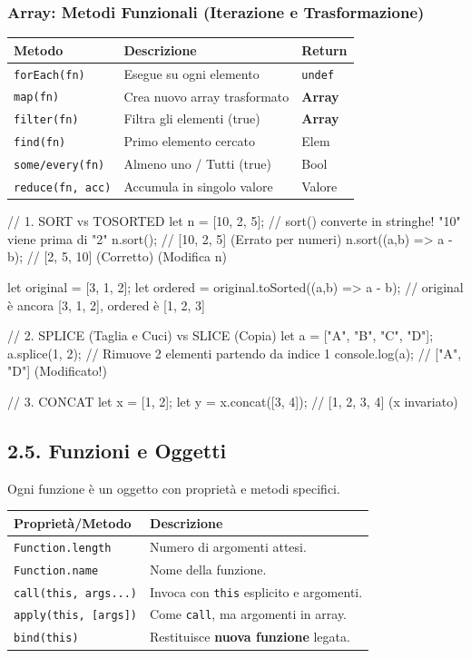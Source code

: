 \subsubsection{Array: Metodi Funzionali (Iterazione e Trasformazione)}
\begin{center}
\begin{tabular}{|l|p{5cm}|l|}
\hline
\textbf{Metodo} & \textbf{Descrizione} & \textbf{Return} \\
\hline
\texttt{forEach(fn)} & Esegue su ogni elemento & \texttt{undef} \\
\hline
\texttt{map(fn)} & Crea nuovo array trasformato & \textbf{Array} \\
\hline
\texttt{filter(fn)} & Filtra gli elementi (true) & \textbf{Array} \\
\hline
\texttt{find(fn)} & Primo elemento cercato & Elem \\
\hline
\texttt{some/every(fn)} & Almeno uno / Tutti (true) & Bool \\
\hline
\texttt{reduce(fn, acc)} & Accumula in singolo valore & Valore \\
\hline
\end{tabular}
\end{center}

\begin{jsbox}
// 1. SORT vs TOSORTED
let n = [10, 2, 5];
// sort() converte in stringhe! "10" viene prima di "2"
n.sort(); // [10, 2, 5] (Errato per numeri)
n.sort((a,b) => a - b); // [2, 5, 10] (Corretto) (Modifica n)

let original = [3, 1, 2];
let ordered = original.toSorted((a,b) => a - b); 
// original è ancora [3, 1, 2], ordered è [1, 2, 3]

// 2. SPLICE (Taglia e Cuci) vs SLICE (Copia)
let a = ["A", "B", "C", "D"];
a.splice(1, 2); // Rimuove 2 elementi partendo da indice 1
console.log(a); // ["A", "D"] (Modificato!)

// 3. CONCAT
let x = [1, 2];
let y = x.concat([3, 4]); // [1, 2, 3, 4] (x invariato)
\end{jsbox}

\subsection{2.5. Funzioni e Oggetti}
Ogni funzione è un oggetto con proprietà e metodi specifici.

\begin{center}
\begin{tabular}{|l|p{6.5cm}|}
\hline
\textbf{Proprietà/Metodo} & \textbf{Descrizione} \\
\hline
\texttt{Function.length} & Numero di argomenti attesi. \\
\hline
\texttt{Function.name} & Nome della funzione. \\
\hline
\texttt{call(this, args...)} & Invoca con \texttt{this} esplicito e argomenti. \\
\hline
\texttt{apply(this, [args])} & Come \texttt{call}, ma argomenti in array. \\
\hline
\texttt{bind(this)} & Restituisce \textbf{nuova funzione} legata. \\
\hline
\end{tabular}
\end{center}

